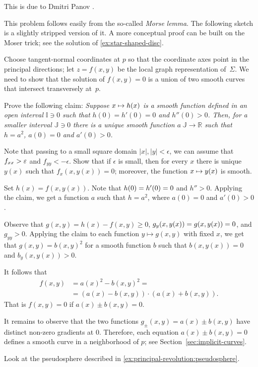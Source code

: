 \begin{multicols}{2}
This is due to Dmitri Panov \cite{panov-curves}.

This problem follows easily from the so-called \emph{Morse lemma}.
The following sketch is a slightly stripped version of it.
A more conceptual proof \cite{palais} can be built on the Moser trick; see the solution of \ref{ex:star-shaped-disc}.

\medskip

Choose tangent-normal coordinates at $p$ so that the coordinate axes point in the principal directions;
let $z=f(x,y)$ be the local graph representation of~$\Sigma$.
We need to show that the solution of $f(x,y)=0$ is a union of two smooth curves that intersect transversely at~$p$.

Prove the following claim:
\textit{Suppose $x\z\mapsto h(x)$ is a smooth function defined in an open interval $\mathbb{I}\ni0$ such that $h(0)=h'(0)=0$ and $h''(0)>0$.
Then, for a smaller interval $\mathbb{J}\ni0$ there is a unique smooth function $a\:\mathbb{J}\to\mathbb{R}$ such that $h=a^2$, $a(0)=0$ and $a'(0)> 0$.}

Note that passing to a small square domain $|x|,|y|<\epsilon$, we can assume that $f_{xx}\z>\epsilon$ and $f_{yy}<-\epsilon$. 
Show that if $\epsilon$ is small, then for every $x$ there is unique $y(x)$ such that $f_x(x,y(x))=0$; 
moreover, the function $x\z\mapsto y(x)$ is smooth.

Set $h(x)=f(x,y(x))$.
Note that $h(0)\z=h'(0)=0$ and $h''>0$.
Applying the claim, we get a function $a$ such that $h=a^2$, where $a(0)=0$ and $a'(0)>0$.

Observe that $g(x,y)=h(x)-f(x,y)\ge 0$, $g_y(x,y(x))\z=g(x,y(x))\z=0$, and $g_{yy}>0$.
Applying the claim to each function $y\mapsto g(x,y)$ with fixed $x$, we get that $g(x,y)=b(x,y)^2$ for a smooth function $b$ such that 
$b(x,y(x))=0$ and $b_y(x,y(x))>0$.

It follows that 
\begin{align*}
f(x,y)&=a(x)^2-b(x,y)^2=
\\
&=
(a(x)-b(x,y))\cdot (a(x)+b(x,y)).
\end{align*}
That is $f(x,y)=0$ if $a(x)\pm b(x,y) =0$.

It remains to observe that the two functions $g_\pm(x,y)=a(x)\pm b(x,y)$ have distinct non-zero gradients at $0$.
Therefore, each equation $a(x)\pm b(x,y) =0$ defines a smooth curve in a neighborhood of $p$;
see Section~\ref{sec:implicit-curves}.

 Look at the pseudosphere described in \ref{ex:principal-revolution:pseudosphere}.


\end{multicols}
